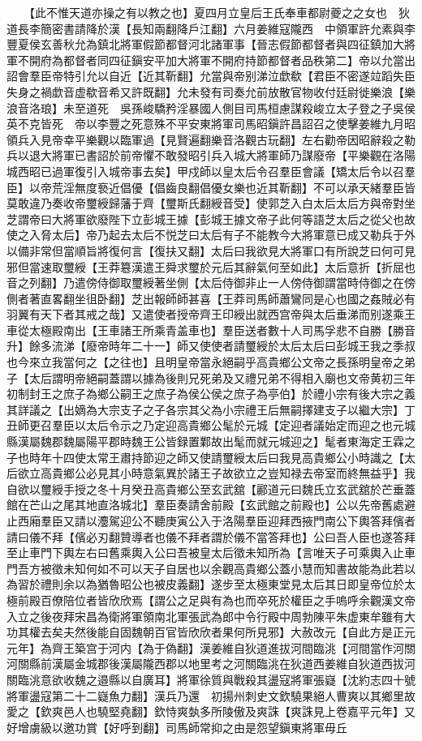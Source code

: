 　　【此不惟天道亦操之有以教之也】夏四月立皇后王氏奉車都尉夔之之女也　狄道長李簡密書請降於漢【長知兩翻降戶江翻】六月姜維寇隴西　中領軍許允素與李豐夏侯玄善秋允為鎮北將軍假節都督河北諸軍事【晉志假節都督者與四征鎮加大將軍不開府為都督者同四征鎭安平加大將軍不開府持節都督者品秩第二】帝以允當出詔會羣臣帝特引允以自近【近其靳翻】允當與帝别涕泣歔欷【君臣不密遂竝蹈失臣失身之禍歔音虚欷音希又許既翻】允未發有司奏允前放散官物收付廷尉徙樂浪【樂浪音洛琅】未至道死　吳孫峻驕矜淫暴國人側目司馬桓慮謀殺峻立太子登之子吳侯英不克皆死　帝以李豐之死意殊不平安東將軍司馬昭鎭許昌詔召之使擊姜維九月昭領兵入見帝幸平樂觀以臨軍過【見賢遍翻樂音洛觀古玩翻】左右勸帝因昭辭殺之勒兵以退大將軍已書詔於前帝懼不敢發昭引兵入城大將軍師乃謀廢帝【平樂觀在洛陽城西昭已過軍復引入城帝事去矣】甲戍師以皇太后令召羣臣會議【矯太后令以召羣臣】以帝荒淫無度䙝近倡優【倡齒良翻倡優女樂也近其靳翻】不可以承天緒羣臣皆莫敢違乃奏收帝璽綬歸藩于齊【璽斯氏翻綬音受】使郭芝入白太后太后方與帝對坐芝謂帝曰大將軍欲廢陛下立彭城王據【彭城王據文帝子此何等語芝太后之從父也故使之入脅太后】帝乃起去太后不悦芝曰太后有子不能教今大將軍意已成又勒兵于外以備非常但當順旨將復何言【復扶又翻】太后曰我欲見大將軍口有所說芝曰何可見邪但當速取璽綬【王莽簒漢遣王舜求璽於元后其辭氣何至如此】太后意折【折屈也音之列翻】乃遣傍侍御取璽綬著坐側【太后侍御非止一人傍侍御謂當時侍御之在傍側者著直畧翻坐徂卧翻】芝出報師師甚喜【王莽司馬師蕭鸞同是心也國之姦賊必有羽翼有天下者其戒之哉】又遣使者授帝齊王印綬出就西宫帝與太后垂涕而别遂乘王車從太極殿南出【王車諸王所乘青盖車也】羣臣送者數十人司馬孚悲不自勝【勝音升】餘多流涕【廢帝時年二十一】師又使使者請璽綬於太后太后曰彭城王我之季叔也今來立我當何之【之往也】且明皇帝當永絕嗣乎高貴鄉公文帝之長孫明皇帝之弟子【太后謂明帝絕嗣蓋謂以據為後則兄死弟及又禮兄弟不得相入廟也文帝黄初三年初制封王之庶子為鄉公嗣王之庶子為侯公侯之庶子為亭伯】於禮小宗有後大宗之義其詳議之【出嫡為大宗支子之子各宗其父為小宗禮王后無嗣擇建支子以繼大宗】丁丑師更召羣臣以太后令示之乃定迎高貴鄉公髦於元城【定迎者議始定而迎之也元城縣漢屬魏郡魏屬陽平郡時魏王公皆録置鄴故出髦而就元城迎之】髦者東海定王霖之子也時年十四使太常王肅持節迎之師又使請璽綬太后曰我見高貴鄉公小時識之【太后欲立高貴鄉公必見其小時意氣異於諸王子故欲立之豈知禄去帝室而終無益乎】我自欲以璽綬手授之冬十月癸丑高貴鄉公至玄武舘【酈道元曰魏氏立玄武舘於芒垂蓋館在芒山之尾其地直洛城北】羣臣奏請舍前殿【玄武館之前殿也】公以先帝舊處避止西廂羣臣又請以灋駕迎公不聽庚寅公入于洛陽羣臣迎拜西掖門南公下輿答拜儐者請曰儀不拜【儐必刃翻贊導者也儀不拜者謂於儀不當答拜也】公曰吾人臣也遂答拜至止車門下輿左右曰舊乘輿入公曰吾被皇太后徵未知所為【言唯天子可乘輿入止車門吾方被徵未知何如不可以天子自居也以余觀高貴鄉公蓋小慧而知書故能為此若以為習於禮則余以為猶魯昭公也被皮義翻】遂步至太極東堂見太后其日即皇帝位於太極前殿百僚陪位者皆欣欣焉【謂公之足與有為也而卒死於權臣之手嗚呼余觀漢文帝入立之後夜拜宋昌為衛將軍領南北軍張武為郎中令行殿中周勃陳平朱虚東牟雖有大功其權去矣夫然後能自固魏朝百官皆欣欣者果何所見邪】大赦改元【自此方是正元元年】為齊王築宫于河内【為于偽翻】漢姜維自狄道進拔河間臨洮【河間當作河關河關縣前漢屬金城郡後漢屬隴西郡以地里考之河關臨洮在狄道西姜維自狄道西拔河關臨洮意欲收魏之邉縣以自廣耳】將軍徐質與戰殺其盪寇將軍張嶷【沈約志四十號將軍盪寇第二十二嶷魚力翻】漢兵乃還　初揚州刺史文欽驍果絕人曹爽以其鄉里故愛之【欽爽邑人也驍堅堯翻】欽恃爽埶多所陵傲及爽誅【爽誅見上卷嘉平元年】又好增虜級以邀功賞【好呼到翻】司馬師常抑之由是怨望鎭東將軍毋丘